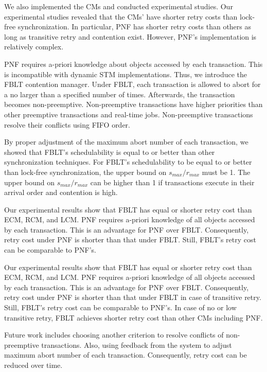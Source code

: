 \documentclass[a4paper,english]{article}
\begin{document}
We also implemented the CMs and conducted experimental studies. Our experimental studies revealed that the CMs' have shorter retry costs than lock-free synchronization. In particular, PNF has shorter retry costs than others as long as transitive retry and contention exist. However, PNF's implementation is relatively complex. 

PNF requires a-priori knowledge about objects accessed by each transaction. This is incompatible with dynamic STM implementations. Thus, we introduce the FBLT contention manager. Under  FBLT, each transaction is allowed to abort for a no larger than a specified number of times. Afterwards, the transaction becomes non-preemptive. Non-preemptive transactions have higher priorities than other preemptive transactions and real-time jobs. Non-preemptive transactions resolve their conflicts using FIFO order.

By proper adjustment of the maximum abort number of each transaction, we showed that FBLT's schedulability is equal to or better than other synchronization techniques. For FBLT's schedulability to be equal to or better than lock-free synchronization, the upper bound on $s_{max}/r_{max}$ must be 1. The upper bound on $s_{max}/r_{max}$ can be higher than 1 if transactions execute in their arrival order and contention is high.

Our experimental results show that FBLT has equal or shorter retry cost than ECM, RCM, and LCM. PNF requires a-priori knowledge of all objects accessed by each transaction. This is an advantage for PNF over FBLT. Consequently, retry cost under PNF is shorter than that under FBLT. Still, FBLT's retry cost can be comparable to PNF's.

Our experimental results show that FBLT has equal or shorter retry cost than ECM, RCM, and LCM. PNF requires a-priori knowledge of all objects accessed by each transaction. This is an advantage for PNF over FBLT. Consequently, retry cost under PNF is shorter than that under FBLT in case of transitive retry. Still, FBLT's retry cost can be comparable to PNF's. In case of no or low transitive retry, FBLT achieves shorter retry cost than other CMs including PNF.

Future work includes choosing another criterion to resolve conflicts of non-preemptive transactions. Also, using feedback from the system to adjust maximum abort number of each transaction. Consequently, retry cost can be reduced over time.






\end{document}
